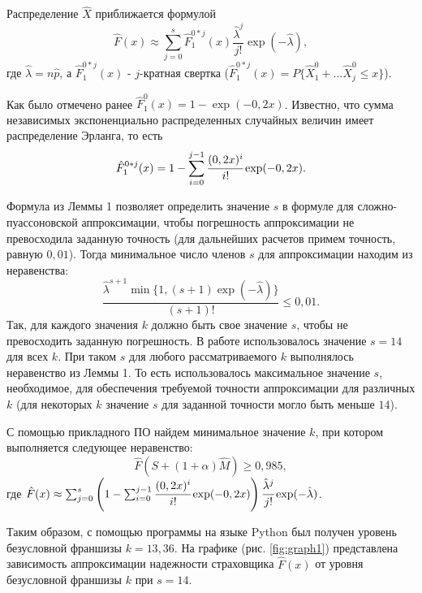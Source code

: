 \documentclass[a4paper,12pt]{article}
\begin{document}
Распределение $\hat{X}$ приближается формулой 
\[\hat{F}(x) \approx \sum_{j = 0}^{s} \hat{F}_1^{0 * j}(x) \frac{\hat{\lambda}^j}{j!}\exp (-\hat{\lambda}),\]
где $\hat{\lambda} = n\hat{p}$, а $\hat{F}_1^{0 * j}(x)$ - $j$-кратная свертка ($\hat{F}_1^{0 * j}(x) = P\{\hat{X}_1^0 + \dots \hat{X}_j^0 \le x\}$).

Как было отмечено ранее $\hat{F}_1^0(x) = 1 - \exp(-0,2 x)$. Известно, что сумма независимых экспоненциально распределенных случайных величин имеет распределение Эрланга, то есть
\[\hat{F}_1^{0 * j}(x) = 1 - \sum_{i = 0}^{j - 1} \cfrac{(0,2 x)^i}{i!} \exp(-0,2x).\]

Формула из Леммы 1 позволяет определить значение $s$ в формуле для сложно-пуассоновской аппроксимации, чтобы погрешность аппроксимации не превосходила заданную точность (для дальнейших расчетов примем точность, равную $0,01$). Тогда минимальное число членов $s$ для аппроксимации находим из неравенства:
\[\frac{\hat{\lambda}^{s + 1} \min\{1, (s + 1)\exp(-\hat{\lambda})\}}{(s + 1)!} \le 0,01.\]
Так, для каждого значения $k$ должно быть свое значение $s$, чтобы не превосходить заданную погрешность. В работе использовалось значение $s = 14$ для всех $k$. При таком $s$ для любого рассматриваемого $k$ выполнялось неравенство из Леммы 1. То есть использовалось максимальное значение $s$, необходимое, для обеспечения требуемой точности аппроксимации для различных $k$ (для некоторых $k$ значение $s$ для заданной точности могло быть меньше $14$).

С помощью прикладного ПО найдем минимальное значение $k$, при котором выполняется следующее неравенство:
\[\hat{F}(S + (1 + \alpha)\hat{M}) \ge 0,985,\]
где $\hat{F}(x) \approx \sum_{j = 0}^{s} \left(1 - \sum_{i = 0}^{j - 1} \cfrac{(0,2 x)^i}{i!} \exp(-0,2x)\right) \cfrac{\hat{\lambda}^j}{j!}\exp (-\hat{\lambda})$.

Таким образом, с помощью программы на языке Python был получен уровень безусловной франшизы $k=13,36$. На графике (рис. \ref{fig:graph1}) представлена зависимость аппроксимации надежности страховщика $\hat{F}(x)$ от уровня безусловной франшизы $k$ при $s = 14$.
\end{document}
